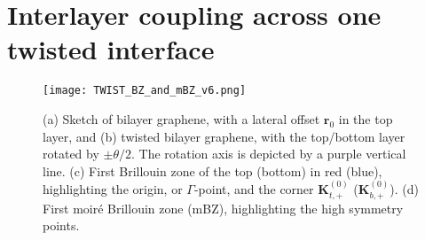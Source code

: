 \documentclass[showpacs,aps,prb,reprint,twocolumn]{revtex4-1}
\begin{document}
\section{Interlayer coupling across one twisted interface}
\label{sec:tblg}

\begin{figure}
\begin{center}
\texttt{[image: TWIST\_BZ\_and\_mBZ\_v6.png]}
\caption{ (a) Sketch of bilayer graphene, with a lateral offset $\boldsymbol{r}_0$ in the top layer, and (b) twisted bilayer graphene, with the top/bottom layer rotated by $\pm\theta/2$. The rotation axis is depicted by a purple vertical line. (c) First Brillouin zone of the top (bottom) in red (blue), highlighting the origin, or $\Gamma$-point, and the corner $\boldsymbol{K}_{t,+}^{(0)}$ ($\boldsymbol{K}_{b,+}^{(0)}$). (d) First moir\'{e} Brillouin zone (mBZ), highlighting the high symmetry points. \label{fig:BZ_and_mBZ}}
\end{center}
\end{figure}
\end{document}
